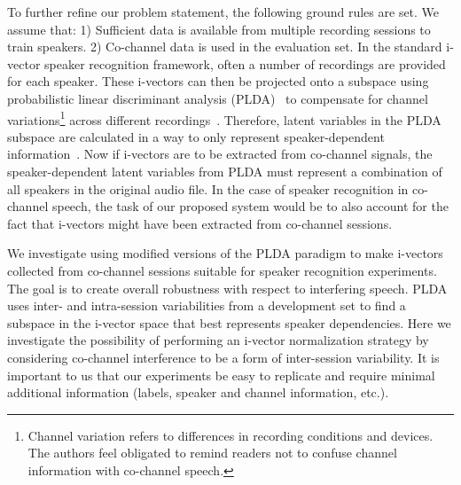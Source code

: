 To further refine our problem statement, the following ground rules are set. We assume that: 1) Sufficient data is available from multiple recording sessions to train speakers. 
2) Co-channel data is used in the evaluation set. In the standard i-vector speaker recognition framework, often a number of recordings are provided for each speaker. 
These i-vectors can then be projected onto a subspace using probabilistic linear discriminant analysis (PLDA)~\cite{prince_plda} to compensate for channel variations\footnote{Channel variation refers to differences in recording conditions and devices. The authors feel obligated to remind readers not to confuse channel information with co-channel speech.} across different recordings~\cite{kenny_plda,Daniel2011is}. 
Therefore, latent variables in the PLDA subspace are calculated in a way to only represent speaker-dependent information~\cite{kenny_plda2,cumani_icassp13,burget_icassp11,yun_icassp12}.
Now if i-vectors are to be extracted from co-channel signals, the speaker-dependent latent variables from PLDA must represent a combination of all speakers in the original audio file. 
In the case of speaker recognition in co-channel speech, the task of our proposed system would be to also account for the fact that i-vectors might have been extracted from co-channel sessions. 

We investigate using modified versions of the PLDA paradigm to make i-vectors collected from co-channel sessions suitable for speaker recognition experiments. The goal is to create overall robustness with respect to interfering speech. 
PLDA uses inter- and intra-session variabilities from a development set to find a subspace in the i-vector space that best represents speaker dependencies. 
Here we investigate the possibility of performing an i-vector normalization strategy by considering co-channel interference to be a form of inter-session variability.  
It is important to us that our experiments be easy to replicate and require minimal additional information (labels, speaker and channel information, etc.). 

